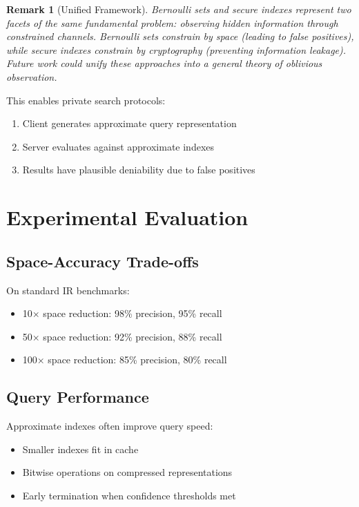 \documentclass[11pt,final,hidelinks]{article}
\newtheorem{remark}[theorem]{Remark}
\begin{document}
\begin{remark}[Unified Framework]
Bernoulli sets and secure indexes represent two facets of the same fundamental problem: observing hidden information through constrained channels. Bernoulli sets constrain by space (leading to false positives), while secure indexes constrain by cryptography (preventing information leakage). Future work could unify these approaches into a general theory of oblivious observation.
\end{remark}

This enables private search protocols:

\begin{enumerate}
    \item Client generates approximate query representation
    \item Server evaluates against approximate indexes
    \item Results have plausible deniability due to false positives
\end{enumerate}

\section{Experimental Evaluation}

\subsection{Space-Accuracy Trade-offs}

On standard IR benchmarks:
\begin{itemize}
    \item 10× space reduction: 98\% precision, 95\% recall
    \item 50× space reduction: 92\% precision, 88\% recall
    \item 100× space reduction: 85\% precision, 80\% recall
\end{itemize}

\subsection{Query Performance}

Approximate indexes often improve query speed:
\begin{itemize}
    \item Smaller indexes fit in cache
    \item Bitwise operations on compressed representations
    \item Early termination when confidence thresholds met
\end{itemize}
\end{document}

